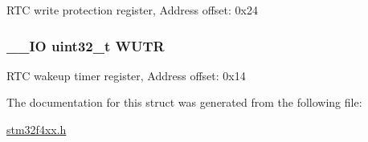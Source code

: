 R\-T\-C write protection register, Address offset\-: 0x24 \hypertarget{struct_r_t_c___type_def_ac5b3c8be61045a304d3076d4714d29f2}{
\subsubsection[{W\-U\-T\-R}]{\setlength{\rightskip}{0pt plus 5cm}\-\_\-\-\_\-\-I\-O uint32\-\_\-t W\-U\-T\-R}}\label{struct_r_t_c___type_def_ac5b3c8be61045a304d3076d4714d29f2}
R\-T\-C wakeup timer register, Address offset\-: 0x14 

The documentation for this struct was generated from the following file\-:\begin{DoxyCompactItemize}
\item 
\hyperlink{stm32f4xx_8h}{stm32f4xx.\-h}\end{DoxyCompactItemize}
